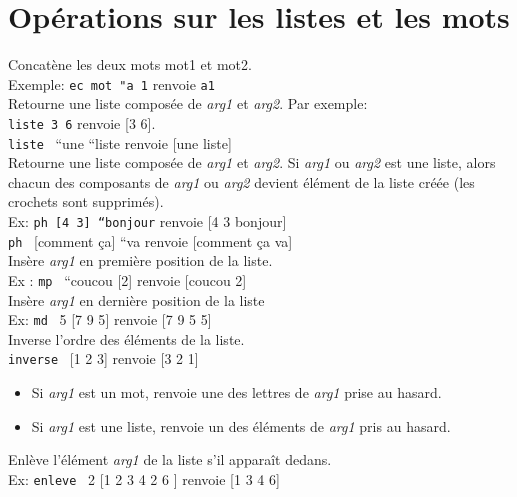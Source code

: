 \section{Opérations sur les listes et les mots}
\noindent {}
Concatène les deux mots mot1 et mot2.\\
Exemple: \texttt{ec mot "a 1} renvoie \texttt{a1}\\
 Retourne une liste composée de \textit{arg1} et \textit{arg2}. Par exemple:\\
 \texttt{liste 3 6} renvoie {[}3 6{]}. \\
\texttt{liste} \ {}``une {}``liste renvoie {[}une liste{]}\\
 Retourne une liste composée de \textit{arg1} et \textit{arg2}. Si \textit{arg1} ou \textit{arg2} est une liste, alors
chacun des composants de \textit{arg1} ou \textit{arg2} devient élément de la liste créée
(les crochets sont supprimés).\\
 Ex: \texttt{ph [4 3] {}``bonjour} renvoie [4 3 bonjour]\\
 \texttt{ph} \ {}{[}comment ça{]} {}``va renvoie {[}comment ça va{]}\\
 Insère \textit{arg1} en première position de la liste.\\
 Ex : \texttt{mp} \ {}{}``coucou {[}2{]} renvoie {[}coucou 2{]}\\
 Insère \textit{arg1} en dernière position de la liste\\
 Ex: \texttt{md} \ 5 {[}7 9 5{]} renvoie {[}7 9 5 5{]}\\
 Inverse l'ordre des éléments de la liste.\\
 \texttt{inverse} \ {}{[}1 2 3{]} renvoie {[}3 2 1{]}\\
\begin{itemize}
 \item Si \textit{arg1} est un mot, renvoie une des lettres de \textit{arg1} prise au hasard.
 \item  Si \textit{arg1} est une liste, renvoie un des éléments de \textit{arg1} pris \textit{}au hasard.\\
\end{itemize}
\noindent
{}
 Enlève l'élément \textit{arg1} de la liste s'il apparaît dedans.\\
 Ex: \texttt{enleve} \ 2 {[}1 2 3 4 2 6 {]} renvoie {[}1 3 4 6{]}\\
